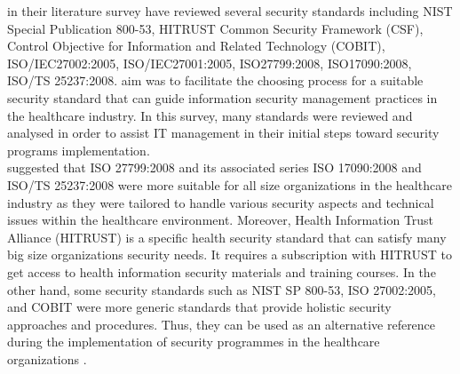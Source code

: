 \citet{Akowuah2013} in their literature survey have reviewed several security standards including NIST Special Publication 800-53, HITRUST Common Security Framework (CSF), Control Objective for Information and Related Technology (COBIT), ISO/IEC27002:2005, ISO/IEC27001:2005, ISO27799:2008, ISO17090:2008, ISO/TS 25237:2008. \cite{Akowuah2013} aim was to facilitate the choosing process for a suitable security standard that can guide information security management practices in the healthcare industry. In this survey, many standards were reviewed and analysed in order to assist IT management in their initial steps toward security programs implementation. \\
\citet{Akowuah2013} suggested that ISO 27799:2008 and its associated series ISO 17090:2008 and ISO/TS 25237:2008 were more suitable for all size organizations in the healthcare industry as they were tailored to handle various security aspects and technical issues within the healthcare environment. Moreover, Health Information Trust Alliance (HITRUST) is a specific health security standard that can satisfy many big size organizations security needs. It requires a subscription with HITRUST to get access to health information security materials and training courses. In the other hand, some security standards such as NIST SP 800-53, ISO 27002:2005, and COBIT were more generic standards that provide holistic security approaches and procedures. Thus, they can be used as an alternative reference during the implementation of security programmes in the healthcare organizations \cite{Akowuah2013}. 

